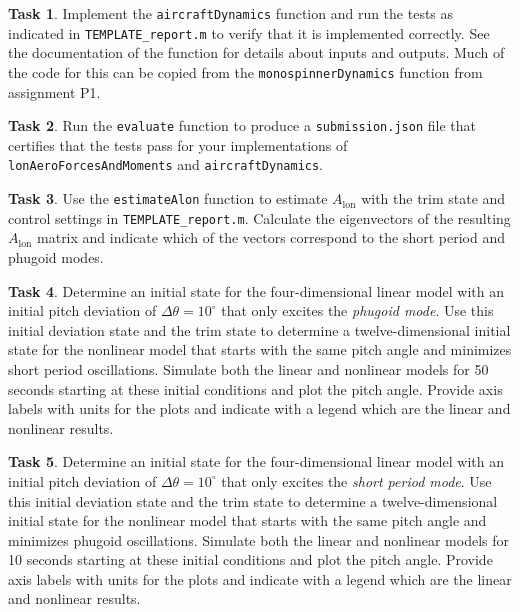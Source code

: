 \documentclass{article}
\theoremstyle{definition}
\newtheorem{task}{Task}
\begin{document}
\begin{task}
    Implement the \texttt{aircraftDynamics} function and run the tests as indicated in \texttt{TEMPLATE\_report.m} to verify that it is implemented correctly. See the documentation of the function for details about inputs and outputs. Much of the code for this can be copied from the \texttt{monospinnerDynamics} function from assignment P1.
\end{task}

\begin{task}
    Run the \texttt{evaluate} function to produce a \texttt{submission.json} file that certifies that the tests pass for your implementations of \texttt{lonAeroForcesAndMoments} and \texttt{aircraftDynamics}.
\end{task}

\begin{task}
    Use the \texttt{estimateAlon} function to estimate $A_\text{lon}$ with the trim state and control settings in \texttt{TEMPLATE\_report.m}. Calculate the eigenvectors of the resulting $A_\text{lon}$ matrix and indicate which of the vectors correspond to the short period and phugoid modes.
\end{task}

\begin{task}
    Determine an initial state for the four-dimensional linear model with an initial pitch deviation of $\Delta\theta = 10^\circ$ that only excites the \emph{phugoid mode}.
    Use this initial deviation state and the trim state to determine a twelve-dimensional initial state for the nonlinear model that starts with the same pitch angle and minimizes short period oscillations.
    Simulate both the linear and nonlinear models for 50 seconds starting at these initial conditions and plot the pitch angle.
    Provide axis labels with units for the plots and indicate with a legend which are the linear and nonlinear results.
\end{task}

\begin{task}
    Determine an initial state for the four-dimensional linear model with an initial pitch deviation of $\Delta\theta = 10^\circ$ that only excites the \emph{short period mode}.
    Use this initial deviation state and the trim state to determine a twelve-dimensional initial state for the nonlinear model that starts with the same pitch angle and minimizes phugoid oscillations.
    Simulate both the linear and nonlinear models for 10 seconds starting at these initial conditions and plot the pitch angle.
    Provide axis labels with units for the plots and indicate with a legend which are the linear and nonlinear results.
\end{task}
\end{document}
